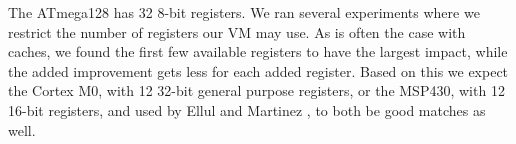 The ATmega128 has 32 8-bit registers. We ran several experiments where we restrict the number of registers our VM may use. As is often the case with caches, we found the first few available registers to have the largest impact, while the added improvement gets less for each added register. Based on this we expect the Cortex M0, with 12 32-bit general purpose registers, or the MSP430, with 12 16-bit registers, and used by Ellul and Martinez \cite{Ellul:2010iw}, to both be good matches as well.








